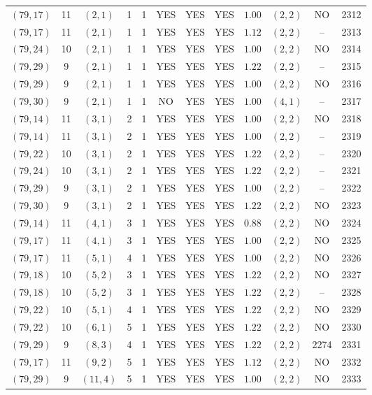 \begin{longtable}{|c|c|c|c|c|c|c|c|c|c|c|c|}
$(79,17)$ & 11 & $(2,1)$ & 1 & 1 & YES & YES & YES & $1.00$ & $(2,2)$ & NO & 2312\\
$(79,17)$ & 11 & $(2,1)$ & 1 & 1 & YES & YES & YES & $1.12$ & $(2,2)$ & -- & 2313\\
$(79,24)$ & 10 & $(2,1)$ & 1 & 1 & YES & YES & YES & $1.00$ & $(2,2)$ & NO & 2314\\
$(79,29)$ & 9 & $(2,1)$ & 1 & 1 & YES & YES & YES & $1.22$ & $(2,2)$ & -- & 2315\\
$(79,29)$ & 9 & $(2,1)$ & 1 & 1 & YES & YES & YES & $1.00$ & $(2,2)$ & NO & 2316\\
$(79,30)$ & 9 & $(2,1)$ & 1 & 1 & NO & YES & YES & $1.00$ & $(4,1)$ & -- & 2317\\
$(79,14)$ & 11 & $(3,1)$ & 2 & 1 & YES & YES & YES & $1.00$ & $(2,2)$ & NO & 2318\\
$(79,14)$ & 11 & $(3,1)$ & 2 & 1 & YES & YES & YES & $1.00$ & $(2,2)$ & -- & 2319\\
$(79,22)$ & 10 & $(3,1)$ & 2 & 1 & YES & YES & YES & $1.22$ & $(2,2)$ & -- & 2320\\
$(79,24)$ & 10 & $(3,1)$ & 2 & 1 & YES & YES & YES & $1.22$ & $(2,2)$ & -- & 2321\\
$(79,29)$ & 9 & $(3,1)$ & 2 & 1 & YES & YES & YES & $1.00$ & $(2,2)$ & -- & 2322\\
$(79,30)$ & 9 & $(3,1)$ & 2 & 1 & YES & YES & YES & $1.22$ & $(2,2)$ & NO & 2323\\
$(79,14)$ & 11 & $(4,1)$ & 3 & 1 & YES & YES & YES & $0.88$ & $(2,2)$ & NO & 2324\\
$(79,17)$ & 11 & $(4,1)$ & 3 & 1 & YES & YES & YES & $1.00$ & $(2,2)$ & NO & 2325\\
$(79,17)$ & 11 & $(5,1)$ & 4 & 1 & YES & YES & YES & $1.00$ & $(2,2)$ & NO & 2326\\
$(79,18)$ & 10 & $(5,2)$ & 3 & 1 & YES & YES & YES & $1.22$ & $(2,2)$ & NO & 2327\\
$(79,18)$ & 10 & $(5,2)$ & 3 & 1 & YES & YES & YES & $1.22$ & $(2,2)$ & -- & 2328\\
$(79,22)$ & 10 & $(5,1)$ & 4 & 1 & YES & YES & YES & $1.22$ & $(2,2)$ & NO & 2329\\
$(79,22)$ & 10 & $(6,1)$ & 5 & 1 & YES & YES & YES & $1.22$ & $(2,2)$ & NO & 2330\\
$(79,29)$ & 9 & $(8,3)$ & 4 & 1 & YES & YES & YES & $1.22$ & $(2,2)$ & 2274 & 2331\\
$(79,17)$ & 11 & $(9,2)$ & 5 & 1 & YES & YES & YES & $1.12$ & $(2,2)$ & NO & 2332\\
$(79,29)$ & 9 & $(11,4)$ & 5 & 1 & YES & YES & YES & $1.00$ & $(2,2)$ & NO & 2333\\

\end{longtable}
